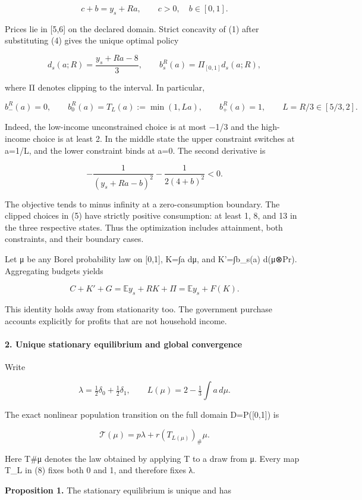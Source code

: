 \documentclass{article}
\begin{document}
\[
c+b=y_s+Ra,\qquad c>0,\quad b\in[0,1].
\tag{4}
\]

Prices lie in [5,6] on the declared domain. Strict concavity of (1) after substituting (4) gives the unique optimal policy

\[
d_s(a;R)=\frac{y_s+Ra-8}{3},\qquad
b_s^R(a)=\Pi_{[0,1]}d_s(a;R),
\tag{5}
\]

where Π denotes clipping to the interval. In particular,

\[
b_-^R(a)=0,\qquad
b_0^R(a)=T_L(a):=\min(1,La),\qquad
b_+^R(a)=1,\qquad L=R/3\in[5/3,2].
\tag{6}
\]

Indeed, the low-income unconstrained choice is at most −1/3 and the high-income choice is at least 2. In the middle state the upper constraint switches at a=1/L, and the lower constraint binds at a=0. The second derivative is

\[
-\frac{1}{(y_s+Ra-b)^2}-\frac{1}{2(4+b)^2}<0.
\]

The objective tends to minus infinity at a zero-consumption boundary. The clipped choices in (5) have strictly positive consumption: at least 1, 8, and 13 in the three respective states. Thus the optimization includes attainment, both constraints, and their boundary cases.

Let μ be any Borel probability law on [0,1], K=∫a dμ, and K'=∫b\_s(a) d(μ⊗Pr). Aggregating budgets yields

\[
C+K'+G=\mathbb E y_s+RK+\Pi
=\mathbb E y_s+F(K).
\tag{7}
\]

This identity holds away from stationarity too. The government purchase accounts explicitly for profits that are not household income.

\paragraph{2. Unique stationary equilibrium and global convergence}

Write

\[
\lambda=\tfrac12\delta_0+\tfrac12\delta_1,\qquad
L(\mu)=2-\tfrac13\int a\,d\mu .
\]

The exact nonlinear population transition on the full domain D=P([0,1]) is

\[
\mathcal T(\mu)=p\lambda+r(T_{L(\mu)})_\#\mu.
\tag{8}
\]

Here T\#μ denotes the law obtained by applying T to a draw from μ. Every map T\_L in (8) fixes both 0 and 1, and therefore fixes λ.

\textbf{Proposition 1.} The stationary equilibrium is unique and has
\end{document}

